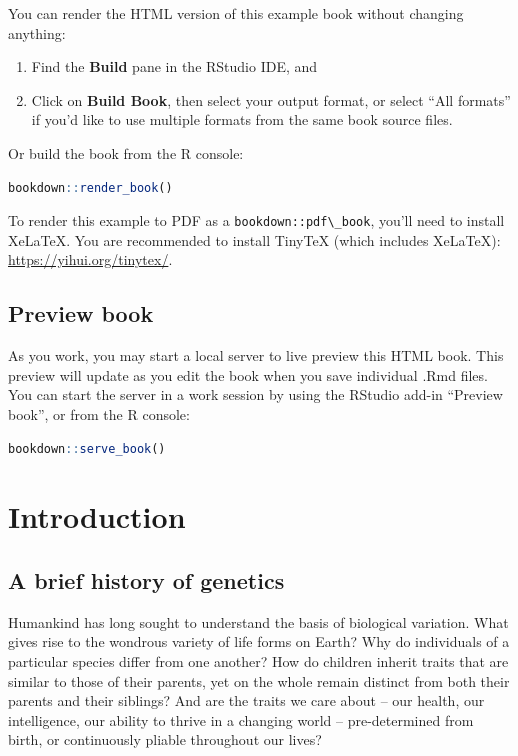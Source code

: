\documentclass[
]{book}
\newcommand{\passthrough}[1]{#1}
\begin{document}
You can render the HTML version of this example book without changing anything:

\begin{enumerate}
\def\labelenumi{\arabic{enumi}.}
\item
  Find the \textbf{Build} pane in the RStudio IDE, and
\item
  Click on \textbf{Build Book}, then select your output format, or select ``All formats'' if you'd like to use multiple formats from the same book source files.
\end{enumerate}

Or build the book from the R console:

\begin{lstlisting}[language=R]
bookdown::render_book()
\end{lstlisting}

To render this example to PDF as a \passthrough{\lstinline!bookdown::pdf\_book!}, you'll need to install XeLaTeX. You are recommended to install TinyTeX (which includes XeLaTeX): \url{https://yihui.org/tinytex/}.

\hypertarget{preview-book}{%
\section{Preview book}\label{preview-book}}

As you work, you may start a local server to live preview this HTML book. This preview will update as you edit the book when you save individual .Rmd files. You can start the server in a work session by using the RStudio add-in ``Preview book'', or from the R console:

\begin{lstlisting}[language=R]
bookdown::serve_book()
\end{lstlisting}

\hypertarget{Introduction}{%
\chapter{Introduction}\label{Introduction}}

\hypertarget{a-brief-history-of-genetics}{%
\section{A brief history of genetics}\label{a-brief-history-of-genetics}}

Humankind has long sought to understand the basis of biological variation. What gives rise to the wondrous variety of life forms on Earth? Why do individuals of a particular species differ from one another? How do children inherit traits that are similar to those of their parents, yet on the whole remain distinct from both their parents and their siblings? And are the traits we care about -- our health, our intelligence, our ability to thrive in a changing world -- pre-determined from birth, or continuously pliable throughout our lives?
\end{document}
